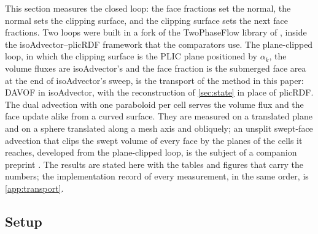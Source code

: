 \documentclass[preprint,12pt]{elsarticle}
\begin{document}
This section measures the closed loop: the face fractions set the normal, the normal sets the clipping surface, and the clipping surface sets the next face fractions. Two loops were built in a fork of the TwoPhaseFlow library of \citet{ScheuflerRoenby2023TwoPhaseFlow}, inside the isoAdvector--plicRDF framework \citep{RoenbyEtAl2016,ScheuflerRoenby2019} that the comparators use. The plane-clipped loop, in which the clipping surface is the PLIC plane positioned by $\alpha_k$, the volume fluxes are isoAdvector's and the face fraction is the submerged face area at the end of isoAdvector's sweep, is the transport of the method in this paper: DAVOF in isoAdvector, with the reconstruction of \cref{sec:state} in place of plicRDF. The dual advection with one paraboloid per cell serves the volume flux and the face update alike from a curved surface. They are measured on a translated plane and on a sphere translated along a mesh axis and obliquely; an unsplit swept-face advection that clips the swept volume of every face by the planes of the cells it reaches, developed from the plane-clipped loop, is the subject of a companion preprint \citep{MaricSweptAdvection2026}. The results are stated here with the tables and figures that carry the numbers; the implementation record of every measurement, in the same order, is \ref{app:transport}.

\subsection{Setup}
\label{sec:tpf-setup}
\end{document}
